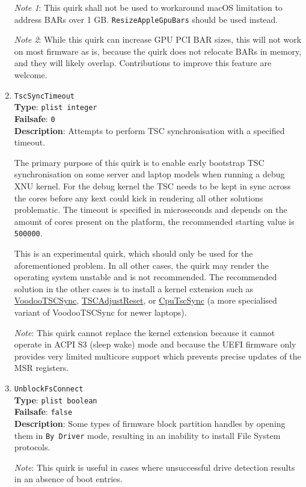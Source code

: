 \documentclass[]{article}
\begin{document}
\begin{enumerate}
  \emph{Note 1}: This quirk shall not be used to workaround macOS limitation
  to address BARs over 1 GB. \texttt{ResizeAppleGpuBars} should be used instead.

  \emph{Note 2}: While this quirk can increase GPU PCI BAR sizes, this will not
  work on most firmware as is, because the quirk does not relocate BARs in memory,
  and they will likely overlap. Contributions to improve this feature are welcome.

\item
  \texttt{TscSyncTimeout}\\
  \textbf{Type}: \texttt{plist\ integer}\\
  \textbf{Failsafe}: \texttt{0}\\
  \textbf{Description}: Attempts to perform TSC synchronisation with a specified timeout.

  The primary purpose of this quirk is to enable early bootstrap TSC synchronisation
  on some server and laptop models when running a debug XNU kernel. For the debug kernel
  the TSC needs to be kept in sync across the cores before any kext could kick in rendering
  all other solutions problematic. The timeout is specified in microseconds and depends on the
  amount of cores present on the platform, the recommended starting value is \texttt{500000}.

  This is an experimental quirk, which should only be used for the aforementioned problem.
  In all other cases, the quirk may render the operating system unstable and is not recommended.
  The recommended solution in the other cases is to install a kernel extension such as
  \href{https://github.com/RehabMan/VoodooTSCSync}{VoodooTSCSync},
  \href{https://github.com/interferenc/TSCAdjustReset}{TSCAdjustReset},
  or \href{https://github.com/lvs1974/CpuTscSync}{CpuTscSync} (a more specialised
  variant of VoodooTSCSync for newer laptops).

  \emph{Note}: This quirk cannot replace the kernel extension because it cannot operate in
  ACPI S3 (sleep wake) mode and because the UEFI firmware only provides very limited
  multicore support which prevents precise updates of the MSR registers.

\item
  \texttt{UnblockFsConnect}\\
  \textbf{Type}: \texttt{plist\ boolean}\\
  \textbf{Failsafe}: \texttt{false}\\
  \textbf{Description}: Some types of firmware block partition handles by opening them
  in \texttt{By\ Driver} mode, resulting in an inability to install File System protocols.

  \emph{Note}: This quirk is useful in cases where unsuccessful drive detection
  results in an absence of boot entries.

\end{enumerate}
\end{document}
